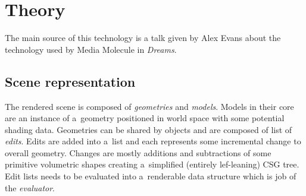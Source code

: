 \documentclass[11pt, a4paper]{article}
\begin{document}

\section{Theory}

The main source of this technology is a talk given by Alex Evans \cite{evans2015} about the technology used by Media Molecule in \emph{Dreams}{\texttrademark}.

\subsection{Scene representation}

The rendered scene is composed of \emph{geometries} and \emph{models}.
Models in their core are an instance of a~geometry positioned in world space with some potential shading data.
Geometries can be shared by objects and are composed of list of \emph{edits}.
Edits are added into a~list and each represents some incremental change to overall geometry.
Changes are mostly additions and subtractions of some primitive volumetric shapes creating a~simplified (entirely lef-leaning) CSG tree.
Edit lists needs to be evaluated into a~renderable data structure which is job of the \emph{evaluator}.
\end{document}
